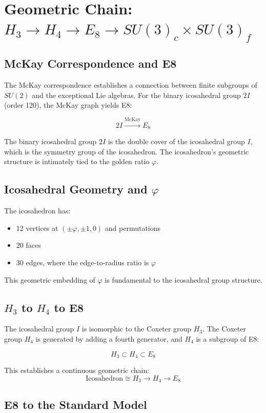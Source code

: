 \documentclass{article}
\begin{document}
\section{Geometric Chain: $H_3 \to H_4 \to E_8 \to SU(3)_c \times SU(3)_f$}

\subsection{McKay Correspondence and E8}

The McKay correspondence establishes a connection between finite subgroups of $SU(2)$ and the exceptional Lie algebras. For the binary icosahedral group $2I$ (order 120), the McKay graph yields E8:

\[
2I \xrightarrow{\text{McKay}} E_8
\]

The binary icosahedral group $2I$ is the double cover of the icosahedral group $I$, which is the symmetry group of the icosahedron. The icosahedron's geometric structure is intimately tied to the golden ratio $\varphi$.

\subsection{Icosahedral Geometry and $\varphi$}

The icosahedron has:
\begin{itemize}
    \item 12 vertices at $(\pm\varphi, \pm1, 0)$ and permutations
    \item 20 faces
    \item 30 edges, where the edge-to-radius ratio is $\varphi$
\end{itemize}

This geometric embedding of $\varphi$ is fundamental to the icosahedral group structure.

\subsection{$H_3$ to $H_4$ to E8}

The icosahedral group $I$ is isomorphic to the Coxeter group $H_3$. The Coxeter group $H_4$ is generated by adding a fourth generator, and $H_4$ is a subgroup of E8:

\[
H_3 \subset H_4 \subset E_8
\]

This establishes a continuous geometric chain:
\[
\text{Icosahedron} \cong H_3 \to H_4 \to E_8
\]

\subsection{E8 to the Standard Model}
\end{document}
